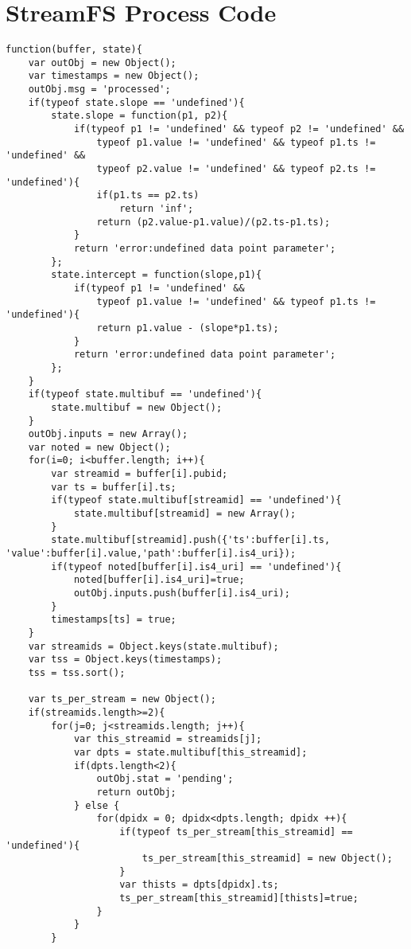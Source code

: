 \chapter{StreamFS Process Code}

\begin{lstlisting}[caption={Load curve code used to generate aggregate load curves in the Energy Lens application.},label={code:loadcurve_full}]
function(buffer, state){
    var outObj = new Object();
    var timestamps = new Object();
    outObj.msg = 'processed';
    if(typeof state.slope == 'undefined'){
        state.slope = function(p1, p2){
            if(typeof p1 != 'undefined' && typeof p2 != 'undefined' &&
                typeof p1.value != 'undefined' && typeof p1.ts != 'undefined' &&
                typeof p2.value != 'undefined' && typeof p2.ts != 'undefined'){
                if(p1.ts == p2.ts)
                    return 'inf';
                return (p2.value-p1.value)/(p2.ts-p1.ts);
            }
            return 'error:undefined data point parameter';
        };
        state.intercept = function(slope,p1){
            if(typeof p1 != 'undefined' &&
                typeof p1.value != 'undefined' && typeof p1.ts != 'undefined'){
                return p1.value - (slope*p1.ts);
            }
            return 'error:undefined data point parameter';
        };
    }
    if(typeof state.multibuf == 'undefined'){
        state.multibuf = new Object();
    }
    outObj.inputs = new Array();
    var noted = new Object();
    for(i=0; i<buffer.length; i++){
        var streamid = buffer[i].pubid;
        var ts = buffer[i].ts;
        if(typeof state.multibuf[streamid] == 'undefined'){
            state.multibuf[streamid] = new Array();
        }
        state.multibuf[streamid].push({'ts':buffer[i].ts, 'value':buffer[i].value,'path':buffer[i].is4_uri});
        if(typeof noted[buffer[i].is4_uri] == 'undefined'){
            noted[buffer[i].is4_uri]=true;
            outObj.inputs.push(buffer[i].is4_uri);
        }
        timestamps[ts] = true;
    }
    var streamids = Object.keys(state.multibuf);
    var tss = Object.keys(timestamps);
    tss = tss.sort();

    var ts_per_stream = new Object();
    if(streamids.length>=2){
        for(j=0; j<streamids.length; j++){
            var this_streamid = streamids[j];
            var dpts = state.multibuf[this_streamid];
            if(dpts.length<2){
                outObj.stat = 'pending';
                return outObj;
            } else {
                for(dpidx = 0; dpidx<dpts.length; dpidx ++){
                    if(typeof ts_per_stream[this_streamid] == 'undefined'){
                        ts_per_stream[this_streamid] = new Object();
                    }
                    var thists = dpts[dpidx].ts;
                    ts_per_stream[this_streamid][thists]=true;
                }
            }
        }


\end{lstlisting}
